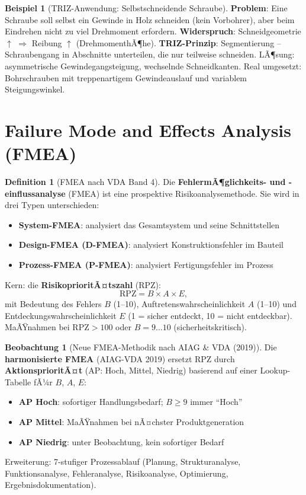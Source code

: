 ﻿\documentclass[a4paper,12pt]{report}
\theoremstyle{definition}
\newtheorem{definition}{Definition}
\newtheorem{beispiel}{Beispiel}
\newtheorem{beobachtung}{Beobachtung}
\begin{document}
\begin{beispiel}[TRIZ-Anwendung: Selbstschneidende Schraube]
\textbf{Problem}: Eine Schraube soll selbst ein Gewinde in Holz schneiden
(kein Vorbohrer), aber beim Eindrehen nicht zu viel Drehmoment erfordern.
\textbf{Widerspruch}: Schneidgeometrie $\uparrow$ $\Rightarrow$ Reibung $\uparrow$ (DrehmomenthÃ¶he).
\textbf{TRIZ-Prinzip}: Segmentierung -- Schraubengang in Abschnitte unterteilen,
die nur teilweise schneiden. LÃ¶sung: asymmetrische Gewindegangsteigung,
wechselnde Schneidkanten. Real umgesetzt: Bohrschrauben mit treppenartigem
Gewindeauslauf und variablem Steigungswinkel.
\end{beispiel}

\section{Failure Mode and Effects Analysis (FMEA)}

\begin{definition}[FMEA nach VDA Band 4]
Die \textbf{FehlermÃ¶glichkeits- und -einflussanalyse} (FMEA) ist eine
prospektive Risikoanalysemethode. Sie wird in drei Typen unterschieden:
\begin{itemize}
    \item[-] \textbf{System-FMEA}: analysiert das Gesamtsystem und seine Schnittstellen
    \item[-] \textbf{Design-FMEA (D-FMEA)}: analysiert Konstruktionsfehler im Bauteil
    \item[-] \textbf{Prozess-FMEA (P-FMEA)}: analysiert Fertigungsfehler im Prozess
\end{itemize}
Kern: die \textbf{RisikoprioritÃ¤tszahl} (RPZ):
\[
  \mathrm{RPZ} = B \times A \times E,
\]
mit Bedeutung des Fehlers $B$ (1--10), Auftretenswahrscheinlichkeit $A$ (1--10)
und Entdeckungswahrscheinlichkeit $E$ (1 = sicher entdeckt, 10 = nicht entdeckbar).
MaÃŸnahmen bei $\mathrm{RPZ} > 100$ oder $B = 9\ldots10$ (sicherheitskritisch).
\end{definition}

\begin{beobachtung}[Neue FMEA-Methodik nach AIAG \& VDA (2019)]
Die \textbf{harmonisierte FMEA} (AIAG-VDA 2019) ersetzt RPZ durch
\textbf{AktionsprioritÃ¤t} (AP: Hoch, Mittel, Niedrig) basierend auf
einer Lookup-Tabelle fÃ¼r $B$, $A$, $E$:
\begin{itemize}
    \item[-] \textbf{AP Hoch}: sofortiger Handlungsbedarf; $B \ge 9$ immer ``Hoch''
    \item[-] \textbf{AP Mittel}: MaÃŸnahmen bei nÃ¤chster Produktgeneration
    \item[-] \textbf{AP Niedrig}: unter Beobachtung, kein sofortiger Bedarf
\end{itemize}
Erweiterung: 7-stufiger Prozessablauf (Planung, Strukturanalyse, Funktionsanalyse,
Fehleranalyse, Risikoanalyse, Optimierung, Ergebnisdokumentation).
\end{beobachtung}
\end{document}
